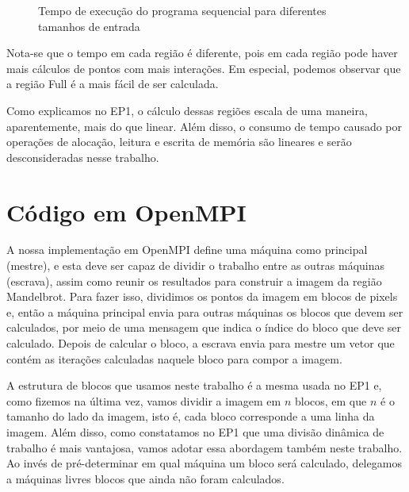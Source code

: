 \documentclass[12pt]{article}
\begin{document}
\begin{figure}[H]
    \caption{Tempo de execução do programa sequencial para diferentes 
    tamanhos de entrada}
\end{figure}

Nota-se que o tempo em cada região é diferente, pois em cada região
pode haver mais cálculos de pontos com mais interações. Em especial, 
podemos observar que a região Full é a mais fácil de ser calculada.

Como explicamos no EP1, o cálculo dessas regiões escala de uma maneira,
aparentemente, mais do que linear. Além disso, o consumo de tempo 
causado por operações de alocação, leitura e escrita de memória são 
lineares e serão desconsideradas nesse trabalho.



\newpage
\section{Código em OpenMPI}
A nossa implementação em OpenMPI define uma máquina como principal 
(mestre), e esta deve ser capaz de dividir o trabalho entre as outras 
máquinas (escrava), assim como reunir os resultados para construir a 
imagem da região Mandelbrot. Para fazer isso, dividimos os pontos da 
imagem em blocos de pixels e, então a máquina principal envia para 
outras máquinas os blocos que devem ser calculados, por meio de uma 
mensagem que indica o índice do bloco que deve ser calculado. Depois de
calcular o bloco, a escrava envia para mestre um vetor que contém as
iterações calculadas naquele bloco para compor a imagem.

A estrutura de blocos que usamos neste trabalho é a mesma usada no EP1 
e, como fizemos na última vez, vamos dividir a imagem em $n$ blocos, em
que $n$ é o tamanho do lado da imagem, isto é, cada bloco corresponde a
uma linha da imagem. Além disso, como constatamos no EP1 que uma divisão
dinâmica de trabalho é mais vantajosa, vamos adotar essa abordagem 
também neste trabalho. Ao invés de pré-determinar em qual máquina um
bloco será calculado, delegamos a máquinas livres blocos que ainda não
foram calculados.
\end{document}

